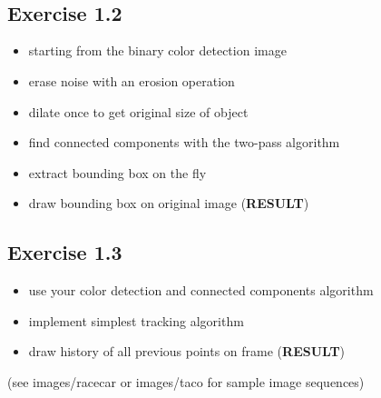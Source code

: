 \documentclass[11pt]{article}
\providecommand{\tightlist}{%
      \setlength{\itemsep}{0pt}\setlength{\parskip}{0pt}}
\begin{document}
    \begin{center}
    \end{center}
    { \hspace*{\fill} \\}
    
    \begin{center}
    \end{center}
    { \hspace*{\fill} \\}
    
    \hypertarget{exercise-1.2}{%
\subsection{Exercise 1.2}\label{exercise-1.2}}

    \begin{itemize}
\tightlist
\item
  starting from the binary color detection image
\item
  erase noise with an erosion operation
\item
  dilate once to get original size of object
\item
  find connected components with the two-pass algorithm
\item
  extract bounding box on the fly
\item
  draw bounding box on original image (\textbf{RESULT})
\end{itemize}

    \hypertarget{exercise-1.3}{%
\subsection{Exercise 1.3}\label{exercise-1.3}}

    \begin{itemize}
\tightlist
\item
  use your color detection and connected components algorithm
\item
  implement simplest tracking algorithm
\item
  draw history of all previous points on frame (\textbf{RESULT})
\end{itemize}

(see images/racecar or images/taco for sample image sequences)


    
    
    
    
\end{document}

